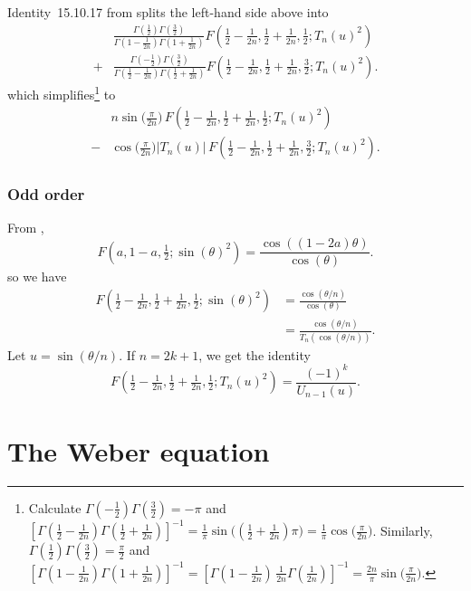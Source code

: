\documentclass{article}
\begin{document}
Identity~15.10.17 from \cite{dlmf} splits the left-hand side above into
\begin{align*}
& \frac{\Gamma(\tfrac{1}{2}) \Gamma(\tfrac{3}{2})}{\Gamma(1 - \tfrac{1}{2n})\Gamma(1 + \tfrac{1}{2n})} F(\tfrac{1}{2} - \tfrac{1}{2n}, \tfrac{1}{2} + \tfrac{1}{2n}, \tfrac{1}{2}; T_n(u)^2) \\
+ & \frac{\Gamma(-\tfrac{1}{2}) \Gamma(\tfrac{3}{2})}{\Gamma(\tfrac{1}{2} - \tfrac{1}{2n})\Gamma(\tfrac{1}{2} + \tfrac{1}{2n})} F(\tfrac{1}{2} - \tfrac{1}{2n}, \tfrac{1}{2} + \tfrac{1}{2n}, \tfrac{3}{2}; T_n(u)^2).
\end{align*}
which simplifies\footnote{Calculate $\Gamma(-\tfrac{1}{2}) \Gamma(\tfrac{3}{2}) = -\pi$ and $[\Gamma(\tfrac{1}{2} - \tfrac{1}{2n})\Gamma(\tfrac{1}{2} + \tfrac{1}{2n})]^{-1} = \tfrac{1}{\pi} \sin\big((\tfrac{1}{2} + \tfrac{1}{2n})\pi\big) = \tfrac{1}{\pi} \cos\big(\tfrac{\pi}{2n}\big)$. Similarly, $\Gamma(\tfrac{1}{2}) \Gamma(\tfrac{3}{2}) = \tfrac{\pi}{2}$ and $[\Gamma(1 - \tfrac{1}{2n})\Gamma(1 + \tfrac{1}{2n})]^{-1} = [\Gamma(1 - \tfrac{1}{2n})\,\tfrac{1}{2n} \Gamma(\tfrac{1}{2n})]^{-1} = \tfrac{2n}{\pi} \sin\big(\tfrac{\pi}{2n}\big)$.} to
\begin{align*}
& n \sin\big(\tfrac{\pi}{2n}\big)\,F(\tfrac{1}{2} - \tfrac{1}{2n}, \tfrac{1}{2} + \tfrac{1}{2n}, \tfrac{1}{2}; T_n(u)^2) \\
- & \cos\big(\tfrac{\pi}{2n}\big)|T_n(u)|\,F(\tfrac{1}{2} - \tfrac{1}{2n}, \tfrac{1}{2} + \tfrac{1}{2n}, \tfrac{3}{2}; T_n(u)^2).
\end{align*}
\subsubsection{Odd order}
From \cite[equation~15.4.14]{dlmf},
\[ F(a, 1-a, \tfrac{1}{2}; \sin(\theta)^2) = \frac{\cos((1-2a)\theta)}{\cos(\theta)}. \]
so we have
\begin{align*}
F\left(\tfrac{1}{2} - \tfrac{1}{2n}, \tfrac{1}{2} + \tfrac{1}{2n}, \tfrac{1}{2}; \sin(\theta)^2\right) & = \frac{\cos(\theta/n)}{\cos(\theta)} \\
& = \frac{\cos(\theta/n)}{T_n(\cos(\theta/n))}.
\end{align*}
Let $u = \sin(\theta/n)$. If $n = 2k + 1$, we get the identity
\[ F\left(\tfrac{1}{2} - \tfrac{1}{2n}, \tfrac{1}{2} + \tfrac{1}{2n}, \tfrac{1}{2}; T_n(u)^2\right) = \frac{(-1)^k}{U_{n-1}(u)}. \]
\section{The Weber equation}
\end{document}
